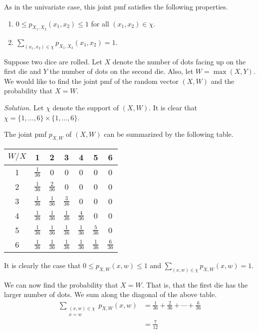 As in the univariate case, this joint pmf satisfies the following properties.
\begin{enumerate}
	\item $0\leq p_{X_1,X_2}(x_1,x_2)\leq 1$ for all $(x_1,x_2)\in\chi$.
	\item $\sum_{(x_1,x_2)\in\chi}p_{X_1,X_2}(x_1,x_2)=1$.
\end{enumerate}

\begin{example}[]
	Suppose two dice are rolled. Let $X$ denote the number of dots facing up on the first die and $Y$ the number of dots on the second die. Also, let $W=\max(X,Y)$. We would like to find the joint pmf of the random vector $(X,W)$ and the probability that $X=W$.

	\textit{Solution.} Let $\chi$ denote the support of $(X,W)$. It is clear that $\chi=\{1,\hdots,6\}\times\{1,\hdots,6\}$.

	The joint pmf $p_{X,W}$ of $(X,W)$ can be summarized by the following table.

	\begin{center}
	\begin{tabular}{c | c c c c c c}
		$W/X$ & 1 & 2 & 3 & 4 & 5 & 6\\\hline
		1 & $\frac{1}{36}$ & 0 & 0 & 0 & 0 & 0\\
		2 & $\frac{1}{36}$ & $\frac{2}{36}$ & 0 & 0 & 0 & 0\\
		3 & $\frac{1}{36}$ & $\frac{1}{36}$ & $\frac{3}{36}$ & 0 & 0 & 0\\
		4 & $\frac{1}{36}$ & $\frac{1}{36}$ & $\frac{1}{36}$ & $\frac{4}{36}$ & 0 & 0\\
		5 & $\frac{1}{36}$ & $\frac{1}{36}$ & $\frac{1}{36}$ & $\frac{1}{36}$ & $\frac{5}{36}$ & 0\\
		6 & $\frac{1}{36}$ & $\frac{1}{36}$ & $\frac{1}{36}$ & $\frac{1}{36}$ & $\frac{1}{36}$ & $\frac{6}{36}$
	\end{tabular}
	\end{center}

	It is clearly the case that $0\leq p_{X,W}(x,w)\leq 1$ and $\sum_{(x,w)\in\chi}p_{X,W}(x,w)=1$.

	We can now find the probability that $X=W$. That is, that the first die has the larger number of dots. We sum along the diagonal of the above table.
	\begin{align*}
		\sum_{\substack{(x,w)\in\chi\\x=w}}p_{X,W}(x,w)&=\frac 1{36}+\frac{2}{36}+\cdots+\frac{6}{36}\\
		&=\frac{7}{12}
	\end{align*}

\end{example}

